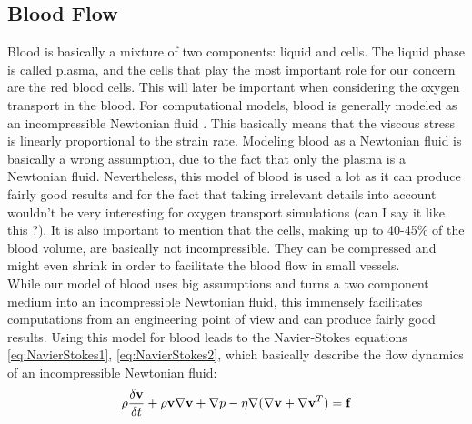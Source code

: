 \subsection{Blood Flow}
\label{Blood Flow}

Blood is basically a mixture of two components: liquid and cells. The liquid phase is called plasma, and the cells that play the most important role for our concern are the red blood cells. This will later be important when considering the oxygen transport in the blood. For computational models, blood is generally modeled as an incompressible Newtonian fluid \cite{mathmodeling}. This basically means that the viscous stress is linearly proportional to the strain rate. Modeling blood as a Newtonian fluid is basically a wrong assumption, due to the fact that only the plasma is a Newtonian fluid. Nevertheless, this model of blood is used a lot as it can produce fairly good results and for the fact that taking irrelevant details into account wouldn't be very interesting for oxygen transport simulations {\color{red} (can I say it like this ?)}. It is also important to mention that the cells, making up to 40-45\% of the blood volume, are basically not incompressible. They can be compressed and might even shrink in order to facilitate the blood flow in small vessels.
\\While our model of blood uses big assumptions and turns a two component medium into an incompressible Newtonian fluid, this immensely facilitates computations from an engineering point of view and can produce fairly good results.
Using this model for blood leads to the Navier-Stokes equations \ref{eq:NavierStokes1}, \ref{eq:NavierStokes2}, which basically describe the flow dynamics of an incompressible Newtonian fluid:
\begin{equation}
\\ \rho \frac{\delta \textbf{v}}{\delta t} + \rho \textbf{v} \nabla \textbf{v} + \nabla p - \eta \nabla ( \nabla \textbf{v} + \nabla \textbf{v}^T ) = \textbf{f}
\label{eq:NavierStokes1}
\end{equation}
